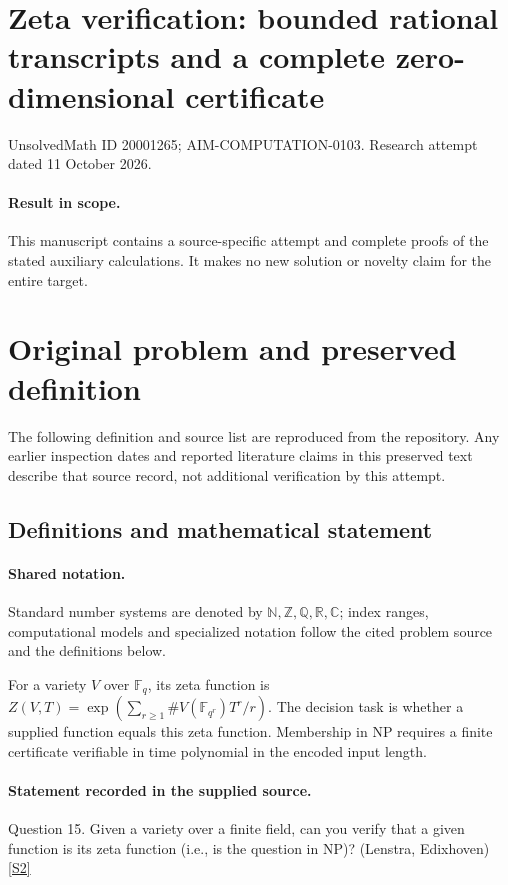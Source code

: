 \documentclass[11pt]{article}
\begin{document}
\section*{Zeta verification: bounded rational transcripts and a complete zero-dimensional certificate}
\noindent UnsolvedMath ID 20001265; AIM-COMPUTATION-0103. Research attempt dated 11 October 2026.
\paragraph{Result in scope.}This manuscript contains a source-specific attempt and complete proofs of the stated auxiliary calculations. It makes no new solution or novelty claim for the entire target.
\section{Original problem and preserved definition}
The following definition and source list are reproduced from the repository. Any earlier inspection dates and reported literature claims in this preserved text describe that source record, not additional verification by this attempt.
\subsection{Definitions and mathematical statement}

\paragraph{Shared notation.}Standard number systems are denoted by $\mathbb N,\mathbb Z,\mathbb Q,\mathbb R,\mathbb C$; index ranges, computational models and specialized notation follow the cited problem source and the definitions below.


For a variety $V$ over $\mathbb F_q$, its zeta function is $Z(V,T)=\exp(\sum_{r\ge1}\#V(\mathbb F_{q^r})T^r/r)$. The decision task is whether a supplied function equals this zeta function. Membership in NP requires a finite certificate verifiable in time polynomial in the encoded input length.
\paragraph{Statement recorded in the supplied source.}
Question 15. Given a variety over a finite field, can you verify that a given function is its zeta function (i.e., is the question in NP)? (Lenstra, Edixhoven) \href{https://aimath.org/WWN/primesinp/primesinp.pdf}{[S2]}
\end{document}
